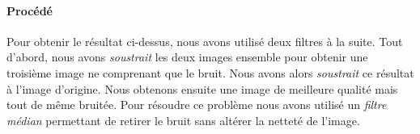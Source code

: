 	\paragraph{Procédé}	
		Pour obtenir le résultat ci-dessus, nous avons utilisé deux filtres à la suite. Tout d'abord, nous avons \emph{soustrait} les deux images ensemble pour obtenir une troisième image ne comprenant que le bruit. Nous avons alors \emph{soustrait} ce résultat à l'image d'origine. Nous obtenons ensuite une image de meilleure qualité mais tout de même bruitée. Pour résoudre ce problème nous avons utilisé un \emph{filtre médian} permettant de retirer le bruit sans altérer la netteté de l'image.